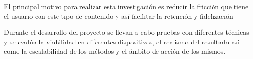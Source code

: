 El principal motivo para realizar esta investigación es reducir la fricción que tiene el usuario con este tipo de contenido y así facilitar la retención y fidelización.

Durante el desarrollo del proyecto se llevan a cabo pruebas con diferentes técnicas y se evalúa la viabilidad en diferentes dispositivos, el realismo del resultado así como la escalabilidad de los métodos y el ámbito de acción de los mismos.















